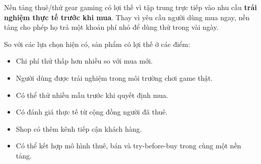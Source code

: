 Nền tảng thuê/thử gear gaming có lợi thế vì tập trung trực tiếp vào nhu cầu \textbf{trải nghiệm thực tế trước khi mua}. Thay vì yêu cầu người dùng mua ngay, nền tảng cho phép họ trả một khoản phí nhỏ để dùng thử trong vài ngày.

So với các lựa chọn hiện có, sản phẩm có lợi thế ở các điểm:

\begin{itemize}
    \item Chi phí thử thấp hơn nhiều so với mua mới.
    \item Người dùng được trải nghiệm trong môi trường chơi game thật.
    \item Có thể thử nhiều mẫu trước khi quyết định mua.
    \item Có đánh giá thực tế từ cộng đồng người đã thuê.
    \item Shop có thêm kênh tiếp cận khách hàng.
    \item Có thể kết hợp mô hình thuê, bán và try-before-buy trong cùng một nền tảng.
\end{itemize}
